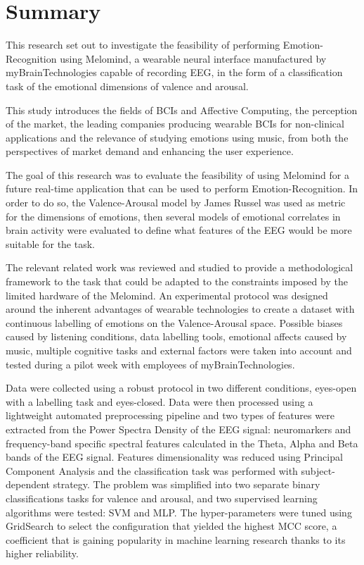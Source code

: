 \chapter{Summary}
\pagestyle{headings}

This research set out to investigate the feasibility of performing Emotion-Recognition using Melomind, a wearable neural interface manufactured by myBrainTechnologies capable of recording \ac{EEG}, in the form of a classification task of the emotional dimensions of valence and arousal.

This study introduces the fields of \ac{BCIs} and Affective Computing, the perception of the market, the leading companies producing wearable \ac{BCIs} for non-clinical applications and the relevance of studying emotions using music, from both the perspectives of market demand and enhancing the user experience.

The goal of this research was to evaluate the feasibility of using Melomind for a future real-time application that can be used to perform Emotion-Recognition. In order to do so, the Valence-Arousal model by James Russel was used as metric for the dimensions of emotions, then several models of emotional correlates in brain activity were evaluated to define what features of the EEG would be more suitable for the task.

The relevant related work was reviewed and studied to provide a methodological framework to the task that could be adapted to the constraints imposed by the limited hardware of the Melomind. An experimental protocol was designed around the inherent advantages of wearable technologies to create a dataset with continuous labelling of emotions on the Valence-Arousal space. Possible biases caused by listening conditions, data labelling tools, emotional affects caused by music, multiple cognitive tasks and external factors were taken into account and tested during a pilot week with employees of myBrainTechnologies.

Data were collected using a robust protocol in two different conditions, eyes-open with a labelling task and eyes-closed. Data were then processed using a lightweight automated preprocessing pipeline and two types of features were extracted from the Power Spectra Density of the EEG signal: neuromarkers and frequency-band specific spectral features calculated in the Theta, Alpha and Beta bands of the EEG signal. Features dimensionality was reduced using Principal Component Analysis and the classification task was performed with subject-dependent strategy. The problem was simplified into two separate binary classifications tasks for valence and arousal, and two supervised learning algorithms were tested: \ac{SVM} and \ac{MLP}. The hyper-parameters were tuned using GridSearch to select the configuration that yielded the highest MCC score, a coefficient that is gaining popularity in machine learning research thanks to its higher reliability. 

